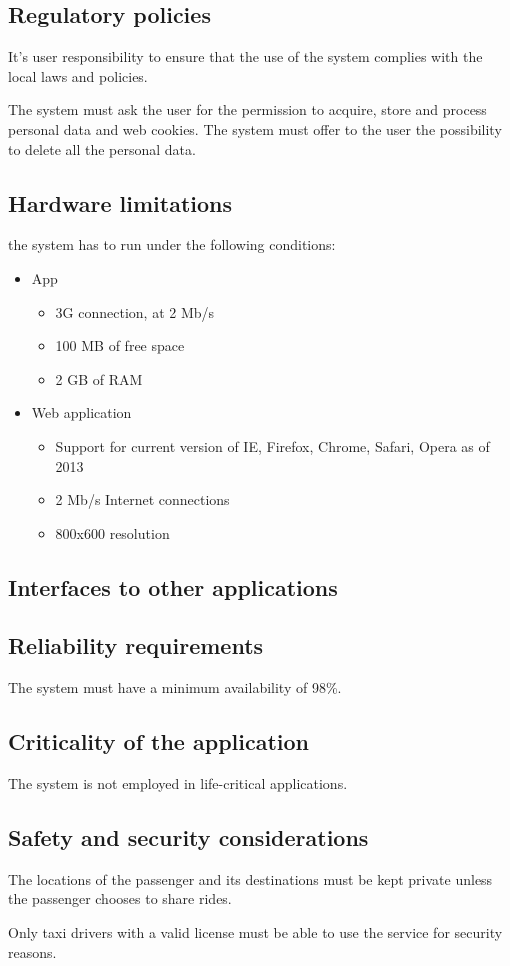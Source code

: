 \subsection{Regulatory policies}
It's user responsibility to ensure that the use of the system complies with the local laws and policies.

The system must ask the user for the permission to acquire, store and process personal data and web cookies. The system must offer to the user the possibility to delete all the personal data.

\subsection{Hardware limitations}
the system has to run under the following conditions:
\begin{itemize}
\item App
\begin{itemize}
\item 3G connection, at 2 Mb/s
\item 100 MB of free space
\item 2 GB of RAM
\end{itemize}
\item Web application
\begin{itemize}
\item Support for current version of IE, Firefox, Chrome, Safari, Opera as of 2013
\item 2 Mb/s Internet connections
\item 800x600 resolution
\end{itemize}
\end{itemize}

\subsection{Interfaces to other applications}

\subsection{Reliability requirements}
The system must have a minimum availability of 98\%.

\subsection{Criticality of the application}
The system is not employed in life-critical applications.

\subsection{Safety and security considerations}
The locations of the passenger and its destinations must be kept private unless the passenger chooses to share rides.

Only taxi drivers with a valid license must be able to use the service for security reasons.
